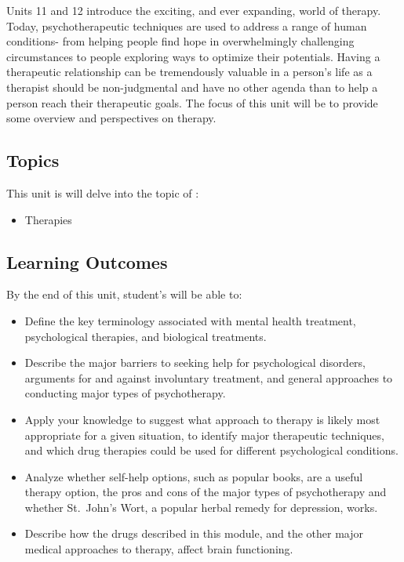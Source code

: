 \documentclass[
]{book}
\providecommand{\tightlist}{%
  \setlength{\itemsep}{0pt}\setlength{\parskip}{0pt}}
\begin{document}
Units 11 and 12 introduce the exciting, and ever expanding, world of therapy. Today, psychotherapeutic techniques are used to address a range of human conditions- from helping people find hope in overwhelmingly challenging circumstances to people exploring ways to optimize their potentials. Having a therapeutic relationship can be tremendously valuable in a person's life as a therapist should be non-judgmental and have no other agenda than to help a person reach their therapeutic goals. The focus of this unit will be to provide some overview and perspectives on therapy.

\hypertarget{topics-10}{%
\subsection*{Topics}\label{topics-10}}

This unit is will delve into the topic of :

\begin{itemize}
\tightlist
\item
  Therapies
\end{itemize}

\hypertarget{learning-outcomes-10}{%
\subsection*{Learning Outcomes}\label{learning-outcomes-10}}

By the end of this unit, student's will be able to:

\begin{itemize}
\tightlist
\item
  Define the key terminology associated with mental health treatment, psychological therapies, and biological treatments.\\
\item
  Describe the major barriers to seeking help for psychological disorders, arguments for and against involuntary treatment, and general approaches to conducting major types of psychotherapy.\\
\item
  Apply your knowledge to suggest what approach to therapy is likely most appropriate for a given situation, to identify major therapeutic techniques, and which drug therapies could be used for different psychological conditions.\\
\item
  Analyze whether self-help options, such as popular books, are a useful therapy option, the pros and cons of the major types of psychotherapy and whether St.~John's Wort, a popular herbal remedy for depression, works.\\
\item
  Describe how the drugs described in this module, and the other major medical approaches to therapy, affect brain functioning.
\end{itemize}
\end{document}
